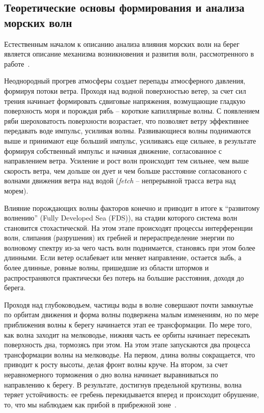 
\subsection{Теоретические основы формирования и анализа морских волн}
\label{sec:wave_theory}

Естественным началом к описанию анализа влияния морских волн на берег является описание механизма возникновения и развития волн, рассмотренного в работе~\cite{DeanDalrymple1991}.

Неоднородный прогрев атмосферы создает перепады атмосферного давления, формируя потоки ветра.
Проходя над водной поверхностью ветер, за счет сил трения начинает формировать сдвиговые напряжения, возмущающие гладкую поверхность моря и порождая рябь -- короткие капиллярные волны.
С появлением ряби шероховатость поверхности возрастает, что позволяет ветру эффективнее передавать воде импульс, усиливая волны.
Развивающиеся волны поднимаются выше и принимают еще больший импульс, усиливаясь еще сильнее, в результате формируя собственный импульс и начиная движение, согласованное с направлением ветра.
Усиление и рост волн происходит тем сильнее, чем выше скорость ветра, чем дольше он дует и чем больше расстояние согласованого с волнами движения ветра над водой (\textit{fetch} -- непрерывной трасса ветра над морем).

Влияние порождающих волны факторов конечно и приводит в итоге к \enquote{развитому волнению} (Fully Developed Sea (FDS)), на стадии которого система волн становится стохастической.
На этом этапе происходят процессы интерференции волн, слипания (разрушения) их гребней и перераспределение энергии по волновому спектру из-за чего часть волн поднимается, становясь при этом более длинными.
Если ветер ослабевает или меняет направление, остается зыбь, а более длинные, ровные волны, пришедшие из области штормов и распространяются практически без потерь на большие расстояния, доходя до берега.

Проходя над глубоководьем, частицы воды в волне совершают почти замкнутые по орбитам движения и форма волны подвержена малым изменениям, но по мере приближения волны к берегу начинается этап ее трансформации.
По мере того, как волна заходит на мелководье, нижняя часть ее орбиты начинает пересекать поверхность дна, тормозясь при этом.
На этом этапе запускаются два процесса трансформации волны на мелководье.
На первом, длина волны сокращается, что приводит к росту высоты, делая фронт волны круче.
На втором, за счет неравномерного торможения о дно волна начинает выравниваться по направлению к берегу.
В результате, достигнув предельной крутизны, волна теряет устойчивость: ее гребень перекидывается вперед и происходит обрушение, то, что мы наблюдаем как прибой в прибрежной зоне~\cite{DeanDalrymple1991}.

